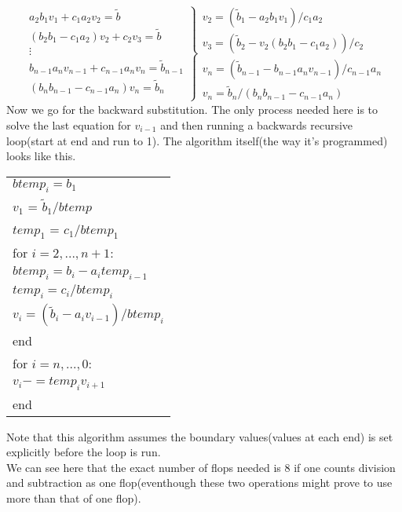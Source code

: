 \documentclass[a4 paper]{report}
\begin{document}
\begin{equation*}
  \left.\ \begin{array}{c}
      a_2b_1v_1 + c_1a_2v_2 = \tilde{b}\\
      (b_2b_1 - c_1a_2)v_2 + c_2v_3 = \tilde{b}\\
      \vdots\\
      b_{n-1}a_{n}v_{n-1} + c_{n-1}a_nv_n = \tilde{b}_{n-1}\\
      (b_nb_{n-1} - c_{n-1}a_n)v_{n} = \tilde{b}_n\\
    \end{array} \right\}
  \begin{array}{l}
    v_2 = (\tilde{b}_1 - a_2b_1v_1)/c_1a_2\\
    v_3 = (\tilde{b}_2 - v_{2}(b_2b_1 - c_1a_2))/c_2\\
    v_n = (\tilde{b}_{n-1} - b_{n-1}a_nv_{n-1})/c_{n-1}a_n\\
    v_n = \tilde{b}_n/(b_nb_{n-1} - c_{n-1}a_n)
  \end{array}
\end{equation*}
Now we go for the backward substitution. The only process needed here is to solve the last equation for $v_{i-1}$ and then running a backwards recursive loop(start at end and run to 1). The algorithm itself(the way it's programmed) looks like this. 
\begin{center}
  \begin{tabular}{l}
    $btemp_i = b_1$\\ 
    $v_1$ = $\tilde{b}_1/btemp$\\
    $temp_1$ = $c_1/btemp_1$\\
    for $i=2,...,n+1$:\\
    \hspace{0.3cm}$btemp_i = b_i - a_itemp_{i-1}$\\
    \hspace{0.3cm}$temp_i = c_i/btemp_i$\\
    \hspace{0.3cm}$v_i = (\tilde{b}_i - a_iv_{i-1})/btemp_i$\\
    \vspace{0.3cm}
    end\\
    for $i=n,...,0$:\\
    \hspace{0.3cm}$v_i -= temp_{i}v_{i+1}$\\
    end
  \end{tabular}
\end{center}
Note that this algorithm assumes the boundary values(values at each end) is set explicitly before the loop is run.\\
We can see here that the exact number of flops needed is 8 if one counts division and subtraction as one flop(eventhough these two operations might prove to use more than that of one flop).
\end{document}
